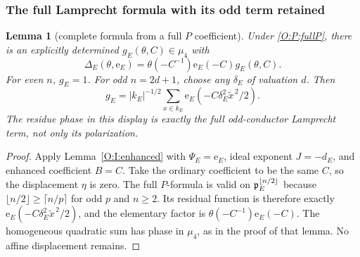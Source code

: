 \documentclass[11pt]{amsart}
\newtheorem{lemma}[theorem]{Lemma}
\theoremstyle{definition}
\theoremstyle{remark}
\newcommand{\ee}{\mathrm e}\newcommand{\echar}{\mathrm e}\newcommand{\FF}{\mathbf F}
\begin{document}
\subsubsection*{The full Lamprecht formula with its odd term retained}
\begin{lemma}[complete formula from a full $P$ coefficient]\label{O:P:lamprecht}
Under \eqref{O:P:fullP}, there is an explicitly determined
$g_E(\theta,C)\in\mu_4$ with
\begin{equation}\label{O:P:Delta}
 \Delta_E(\theta,\ee_E)
 =\theta(-C^{-1})\ee_E(-C)g_E(\theta,C).
\end{equation}
For even $n$, $g_E=1$. For odd $n=2d+1$, choose any $\delta_E$
of valuation $d$. Then
\begin{equation}\label{O:P:gauss}
 g_E=|k_E|^{-1/2}\sum_{x\in k_E}
       \ee_E(-C\delta_E^2\widetilde x^{\,2}/2).
\end{equation}
The residue phase in this display is exactly the full odd-conductor
Lamprecht term, not only its polarization.
\end{lemma}
\begin{proof}
Apply Lemma~\ref{O:I:enhanced} with $\Psi_E=\ee_E$, ideal exponent
$J=-d_E$, and enhanced coefficient $B=C$. Take the ordinary coefficient
to be the same $C$, so the displacement $\eta$ is zero. The full
$P$-formula is valid on $\mathfrak p_E^{\lfloor n/2\rfloor}$ because
$\lfloor n/2\rfloor\ge\lceil n/p\rceil$ for odd $p$ and $n\ge2$.
Its residual function is therefore exactly
$\ee_E(-C\delta_E^2\widetilde x^{\,2}/2)$, and the elementary factor is
$\theta(-C^{-1})\ee_E(-C)$. The homogeneous quadratic sum has phase in
$\mu_4$, as in the proof of that lemma. No affine displacement remains.
\end{proof}
\end{document}
